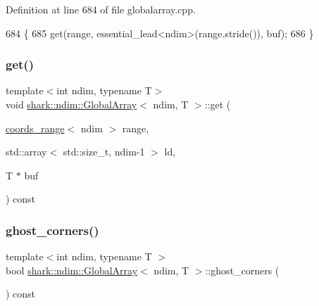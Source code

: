 Definition at line 684 of file globalarray.\+cpp.


\begin{DoxyCode}
684                                                                     \{
685     \textcolor{keyword}{get}(range, essential\_lead<ndim>(range.stride()), buf);
686 \}
\end{DoxyCode}
\hypertarget{classshark_1_1ndim_1_1_global_array_a7df181f976618d26c70d6a2b364ab459}{}\label{classshark_1_1ndim_1_1_global_array_a7df181f976618d26c70d6a2b364ab459} 
\subsubsection{\texorpdfstring{get()}{get()}\hspace{0.1cm}{\footnotesize\ttfamily [3/3]}}
{\footnotesize\ttfamily template$<$int ndim, typename T$>$ \\
void \hyperlink{classshark_1_1ndim_1_1_global_array}{shark\+::ndim\+::\+Global\+Array}$<$ ndim, T $>$\+::get (\begin{DoxyParamCaption}\item[{\hyperlink{structshark_1_1ndim_1_1coords__range}{coords\+\_\+range}$<$ ndim $>$}]{range,  }\item[{std\+::array$<$ std\+::size\+\_\+t, ndim-\/1 $>$}]{ld,  }\item[{T $\ast$}]{buf }\end{DoxyParamCaption}) const}

\hypertarget{classshark_1_1ndim_1_1_global_array_abf0c9312657087578f89e1279ee6c451}{}\label{classshark_1_1ndim_1_1_global_array_abf0c9312657087578f89e1279ee6c451} 
\subsubsection{\texorpdfstring{ghost\+\_\+corners()}{ghost\_corners()}}
{\footnotesize\ttfamily template$<$int ndim, typename T $>$ \\
bool \hyperlink{classshark_1_1ndim_1_1_global_array}{shark\+::ndim\+::\+Global\+Array}$<$ ndim, T $>$\+::ghost\+\_\+corners (\begin{DoxyParamCaption}{ }\end{DoxyParamCaption}) const\hspace{0.3cm}{\ttfamily [inline]}}


